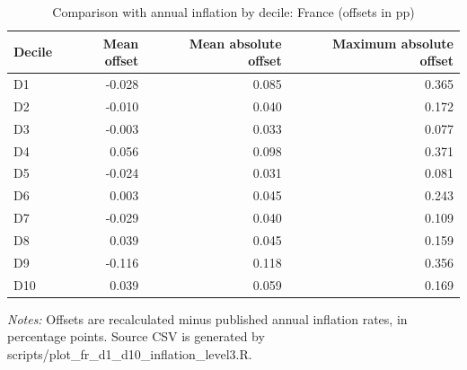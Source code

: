 \begin{table}[H]
\centering
\caption{Comparison with annual inflation by decile: France (offsets in pp)}
\label{tab:fr-decile-validation-legacy}
\begin{tabular}{lrrr}
\toprule
Decile & Mean offset & Mean absolute offset & Maximum absolute offset \\
\midrule
D1 & -0.028 & 0.085 & 0.365 \\
D2 & -0.010 & 0.040 & 0.172 \\
D3 & -0.003 & 0.033 & 0.077 \\
D4 & 0.056 & 0.098 & 0.371 \\
D5 & -0.024 & 0.031 & 0.081 \\
D6 & 0.003 & 0.045 & 0.243 \\
D7 & -0.029 & 0.040 & 0.109 \\
D8 & 0.039 & 0.045 & 0.159 \\
D9 & -0.116 & 0.118 & 0.356 \\
D10 & 0.039 & 0.059 & 0.169 \\
\bottomrule
\end{tabular}
\begin{flushleft}
\footnotesize{\emph{Notes:} Offsets are recalculated minus published annual inflation rates, in percentage points. Source CSV is generated by scripts/plot\_fr\_d1\_d10\_inflation\_level3.R.}
\end{flushleft}
\end{table}
